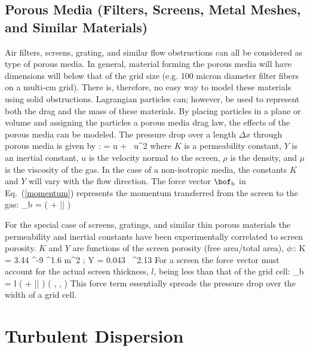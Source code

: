 \subsection{Porous Media (Filters, Screens, Metal Meshes, and Similar Materials)}

Air filters, screens, grating, and similar flow obstructions can all be considered
as type of porous media. In general, material forming the porous media will have dimensions will below that of the grid size (e.g. 100 micron diameter filter fibers on a multi-cm grid).  There is, therefore, no easy way to model these materials using solid obstructions. Lagrangian particles can; however, be used to represent both the drag and the mass of these materials. By placing particles in a plane or volume and assigning the particles a porous media drag law, the effects of the porous media can be modeled. The pressure drop over a length $\Delta x$ through porous media is given by \cite{VafaiTien:1981}:
\be
    =   u + \rho {} \, u^2
\ee
where $K$ is a permeability constant, $Y$ is an inertial constant, $u$ is the velocity normal to the screen, $\rho$ is the density, and $\mu$ is the viscosity of the gas. In the case of a non-isotropic media, the constants $K$ and $Y$ will vary with the flow direction.
The force vector $\bof_{\rm b}$ in Eq.~(\ref{momentum}) represents the momentum transferred from the screen to the gas:
\be
   \bof_{\rm b} = \left(  + \rho {} |\bu| \right) \bu
\ee

For the special case of screens, gratings, and similar thin porous materials the permeability and inertial constants have been experimentally correlated to screen porosity.  $K$ and $Y$ are functions of the screen porosity (free area/total area), $\phi$:\cite{Bartzanas:1}:
\be
   K = 3.44 ^{-9} \; \phi^{1.6} \; \; \hbox{m}^2 \quad ; \quad Y = 0.043 \, \phi^{2.13}
\ee
For a screen the force vector must account for the actual screen thickness, $l$, being less than that of the grid cell:
\be
   \bof_{\rm b} = l \; \left(  + \rho {} |\bu| \right) \left(  ,  ,  \right)
\ee
This force term essentially spreads the pressure drop over the width of a grid cell.


\section{Turbulent Dispersion}

